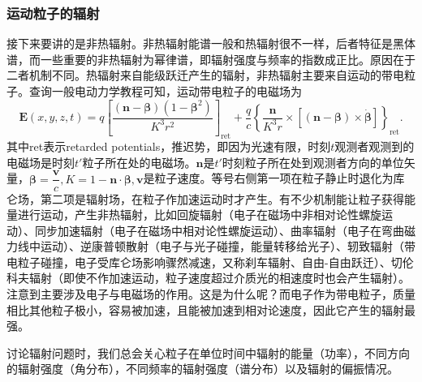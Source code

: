 \documentclass[../天体物理基础.tex]{subfiles}
\begin{document}
\subsubsection{运动粒子的辐射}
接下来要讲的是非热辐射。非热辐射能谱一般和热辐射很不一样，后者特征是黑体谱，而一些重要的非热辐射为幂律谱，即辐射强度与频率的指数成正比。原因在于二者机制不同。热辐射来自能级跃迁产生的辐射，非热辐射主要来自运动的带电粒子。查询一般电动力学教程可知，运动带电粒子的电磁场为
\begin{equation}
\boldsymbol{E}\left(x,y,z,t\right)=q\left[\frac{\left(\boldsymbol{n}-\boldsymbol{\beta}\right)\left(1-\boldsymbol{\beta}^{2}\right)}{K^{3}r^{2}}\right]_{\text{ret}}+\frac{q}{c}\left\{\frac{\boldsymbol{n}}{K^{3}r}\times\left[\left(\boldsymbol{n}-\boldsymbol{\beta}\right)\times\dot{\boldsymbol{\beta}}\right]\right\}_{\text{ret}}.\label{1.3.38}
\end{equation}
其中ret表示retarded potentials，推迟势，即因为光速有限，时刻$t$观测者观测到的电磁场是时刻$t'$粒子所在处的电磁场。$\boldsymbol{n}$是$t'$时刻粒子所在处到观测者方向的单位矢量，$\boldsymbol{\beta}=\dfrac{\boldsymbol{v}}{c},K=1-\boldsymbol{n}\cdot\boldsymbol{\beta},\boldsymbol{v}$是粒子速度。等号右侧第一项在粒子静止时退化为库仑场，第二项是辐射场，在粒子作加速运动时才产生。有不少机制能让粒子获得能量进行运动，产生非热辐射，比如回旋辐射（电子在磁场中非相对论性螺旋运动）、同步加速辐射（电子在磁场中相对论性螺旋运动）、曲率辐射（电子在弯曲磁力线中运动）、逆康普顿散射（电子与光子碰撞，能量转移给光子）、轫致辐射（带电粒子碰撞，电子受库仑场影响骤然减速，又称刹车辐射、自由-自由跃迁）、切伦科夫辐射（即使不作加速运动，粒子速度超过介质光的相速度时也会产生辐射）。注意到主要涉及电子与电磁场的作用。这是为什么呢？而电子作为带电粒子，质量相比其他粒子极小，容易被加速，且能被加速到相对论速度，因此它产生的辐射最强。

讨论辐射问题时，我们总会关心粒子在单位时间中辐射的能量（功率），不同方向的辐射强度（角分布），不同频率的辐射强度（谱分布）以及辐射的偏振情况。
\end{document}

